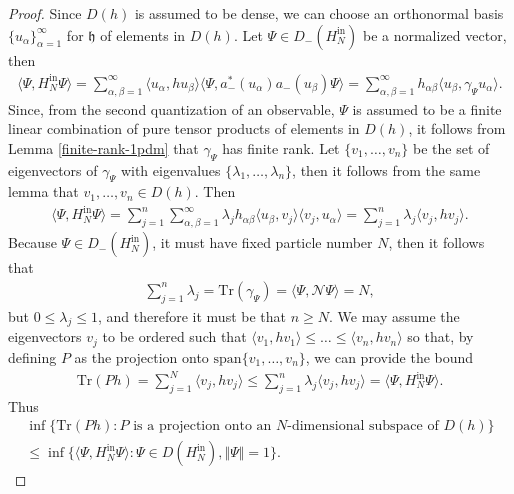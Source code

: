 \begin{proof}
	Since $D(h)$ is assumed to be dense, we can choose an orthonormal basis
	$\{u_\alpha\}_{\alpha=1}^\infty$ for $\mathfrak{h}$ of elements in $D(h)$. Let
	$\Psi\in D_-(H_N^{\mathrm{in}})$ be a normalized vector, then
	\begin{align*}
		\langle\Psi,H_N^{\mathrm{in}}\Psi\rangle
		= \sum_{\alpha,\beta=1}^\infty \langle u_\alpha,h u_\beta\rangle \langle\Psi,a^*_-(u_\alpha)a_-(u_\beta)\Psi\rangle
		= \sum_{\alpha,\beta=1}^\infty h_{\alpha\beta} \langle u_\beta,\gamma_\Psi u_\alpha\rangle.
	\end{align*}
	Since, from the second quantization of an observable, $\Psi$ is assumed to be a finite
	linear combination of pure tensor products of elements in $D(h)$, it follows from Lemma
	\ref{finite-rank-1pdm} that $\gamma_\Psi$ has finite rank. Let $\{v_1,\ldots,v_n\}$ be the
	set of eigenvectors of $\gamma_\Psi$ with eigenvalues $\{\lambda_1,\ldots,\lambda_n\}$,
	then it follows from the same lemma that $v_1,\ldots,v_n\in D(h)$. Then
	\begin{align*}
		\langle\Psi,H_N^{\mathrm{in}}\Psi\rangle
		= \sum_{j=1}^n\sum_{\alpha,\beta=1}^\infty \lambda_j h_{\alpha\beta} \langle u_\beta,v_j\rangle\langle v_j,u_\alpha\rangle
		= \sum_{j=1}^n \lambda_j \langle v_j, h v_j\rangle.
	\end{align*}
	Because $\Psi\in D_-(H_N^{\mathrm{in}})$, it must have fixed particle number $N$, then it
	follows that
	\begin{align*}
		\sum_{j=1}^n \lambda_j = \mathrm{Tr}(\gamma_\Psi) = \langle\Psi,\mathcal{N}\Psi\rangle = N,
	\end{align*}
	but $0\leq\lambda_j\leq1$, and therefore it must be that $n\geq N$. We may assume the
	eigenvectors $v_j$ to be ordered such that $\langle v_1,h v_1\rangle\leq\ldots\leq\langle v_n,h v_n\rangle$
	so that, by defining $P$ as the projection onto $\mathrm{span}\{v_1,\ldots,v_n\}$, we
	can provide the bound
	\begin{align*}
		\mathrm{Tr}(Ph) = \sum_{j=1}^N \langle v_j,h v_j\rangle
		\leq \sum_{j=1}^n \lambda_j \langle v_j,h v_j\rangle = \langle\Psi,H_N^{\mathrm{in}}\Psi\rangle.
	\end{align*}
	Thus
	\begin{align*}
		\inf \{\mathrm{Tr}(Ph) : P \text{ is a projection onto an $N$-dimensional subspace of } D(h)\} \\
		\leq \inf \{\langle\Psi,H_N^{\mathrm{in}}\Psi\rangle : \Psi\in D(H_N^{\mathrm{in}}),
		\Vert\Psi\Vert=1\}.
	\end{align*}

\end{proof}
